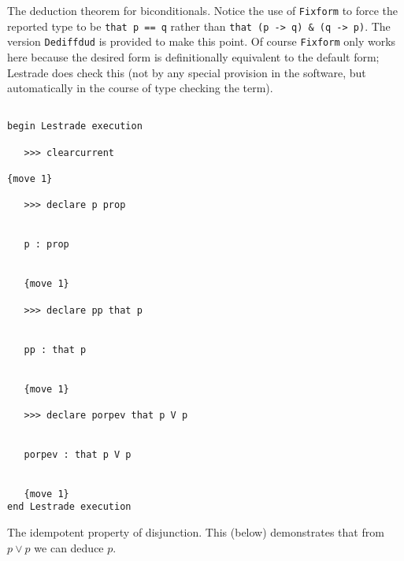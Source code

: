 \documentclass[12pt]{article}
\begin{document}
The deduction theorem for biconditionals.  Notice the use of {\tt Fixform} to force the reported type to be {\tt that p == q} rather than {\tt that (p -> q) \& (q -> p)}.  The version {\tt Dediffdud} is provided to make this point. 
 Of course {\tt Fixform} only works here because the desired form is definitionally equivalent to the default form;  Lestrade does check this (not by any special provision in the software, but automatically in the course of type checking the term).

\begin{verbatim}

begin Lestrade execution

   >>> clearcurrent

{move 1}

   >>> declare p prop


   p : prop


   {move 1}

   >>> declare pp that p


   pp : that p


   {move 1}

   >>> declare porpev that p V p


   porpev : that p V p


   {move 1}
end Lestrade execution
\end{verbatim}

The idempotent property of disjunction.  This (below) demonstrates that from $p \vee p$ we can deduce $p$.
\end{document}
